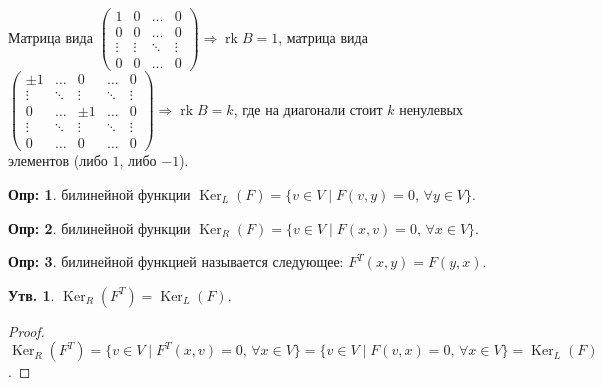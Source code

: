 \documentclass[12pt]{article}
\theoremstyle{definition}
\newtheorem{defn}{Опр:}
\newtheorem{prop}{Утв.}
\DeclareMathOperator{\Ker}{Ker}
\DeclareMathOperator{\rk}{rk}
\begin{document}
Матрица вида $\begin{pmatrix}
	1 & 0 & \dotsc & 0 \\
	0 & 0 & \dotsc & 0\\
	\vdots & \vdots & \ddots & \vdots \\
	0  & 0 & \dotsc & 0
\end{pmatrix} \Rightarrow \rk{B} = 1$, матрица вида $
\begin{pmatrix}
	\pm 1 & \dotsc & 0 & \dotsc & 0 \\
	\vdots & \ddots &  \vdots & \ddots &  \vdots\\
	0 & \dotsc & \pm 1 & \dotsc & 0 \\
	\vdots & \ddots &  \vdots & \ddots &  \vdots\\
	0 & \dotsc & 0 & \dotsc & 0 	
\end{pmatrix}
 \Rightarrow \rk{B} = k$, где на диагонали стоит $k$ ненулевых элементов (либо $1$, либо $-1$).
 
\begin{defn}
	 билинейной функции $\Ker_L(F) = \{v \in V \mid F(v,y) = 0, \, \forall y \in V\}$.
\end{defn}

\begin{defn}
	 билинейной функции $\Ker_R(F) = \{v \in V \mid F(x,v) = 0, \, \forall x \in V\}$.
\end{defn}
\begin{defn}
	 билинейной функцией называется следующее: $F^T(x,y) = F(y,x)$.
\end{defn}
\begin{prop}
	$\Ker_R\left(F^T\right) = \Ker_L(F)$.
\end{prop}
\begin{proof}
	$\Ker_R\left(F^T\right) = \{v \in V \mid F^T(x,v) = 0, \, \forall x \in V\} = \{v \in V \mid F(v,x) = 0, \, \forall x \in V\} = \Ker_L(F)$.
\end{proof}
\end{document}
